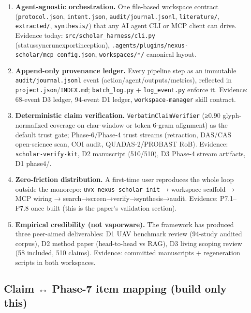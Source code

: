 \documentclass[11pt]{article}
\providecommand{\tightlist}{%
  \setlength{\itemsep}{0pt}\setlength{\parskip}{0pt}}
\begin{document}
\begin{enumerate}
\def\labelenumi{\arabic{enumi}.}
\tightlist
\item
  \textbf{Agent-agnostic orchestration.} One file-based workspace
  contract (\texttt{protocol.json}, \texttt{intent.json},
  \texttt{audit/journal.jsonl}, \texttt{literature/},
  \texttt{extracted/}, \texttt{synthesis/}) that any AI agent CLI or MCP
  client can drive. Evidence today: \texttt{src/scholar\_harness/cli.py}
  (status\textbar sync\textbar run\textbar export\textbar inception),
  \texttt{.agents/plugins/nexus-scholar/mcp\_config.json},
  \texttt{workspaces/*/} canonical layout.
\item
  \textbf{Append-only provenance ledger.} Every pipeline step as an
  immutable \texttt{audit/journal.jsonl} event
  (action/agent/outputs/metrics), reflected in
  \texttt{project.json}/\texttt{INDEX.md}; \texttt{batch\_log.py} +
  \texttt{log\_event.py} enforce it. Evidence: 68-event D3 ledger,
  94-event D1 ledger, \texttt{workspace-manager} skill contract.
\item
  \textbf{Deterministic claim verification.}
  \texttt{VerbatimClaimVerifier} (≥0.90 glyph-normalized coverage on
  char-window or token 6-gram alignment) as the default trust gate;
  Phase-6/Phase-4 trust streams (retraction, DAS/CAS open-science scan,
  COI audit, QUADAS-2/PROBAST RoB). Evidence:
  \texttt{scholar-verify-kit}, D2 manuscript (510/510), D3 Phase-4
  stream artifacts, D1 phase4/.
\item
  \textbf{Zero-friction distribution.} A first-time user reproduces the
  whole loop outside the monorepo: \texttt{uvx\ nexus-scholar\ init} →
  workspace scaffold → MCP wiring →
  search→screen→verify→synthesis→audit. Evidence: P7.1--P7.8 once built
  (this is the paper's validation section).
\item
  \textbf{Empirical credibility (not vaporware).} The framework has
  produced three peer-aimed deliverables: D1 UAV benchmark review
  (94-study audited corpus), D2 method paper (head-to-head vs RAG), D3
  living scoping review (58 included, 510 claims). Evidence: committed
  manuscripts + regeneration scripts in both workspaces.
\end{enumerate}

\subsection{Claim ↔ Phase-7 item mapping (build only
this)}\label{claim-phase-7-item-mapping-build-only-this}
\end{document}
